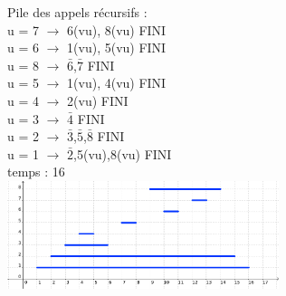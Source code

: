 Pile des appels récursifs : \\
u = 7 $\rightarrow$ 6(vu), 8(vu) FINI \\
u = 6 $\rightarrow$ 1(vu), 5(vu) FINI \\
u = 8 $\rightarrow$ $\bar{6}$,$\bar{7}$ FINI \\
u = 5 $\rightarrow$ 1(vu), 4(vu) FINI \\
u = 4 $\rightarrow$ 2(vu) FINI \\
u = 3 $\rightarrow$ $\bar{4}$ FINI \\
u = 2 $\rightarrow$ $\bar{3}$,$\bar{5}$,$\bar{8}$ FINI \\
u = 1 $\rightarrow$ $\bar{2}$,5(vu),8(vu) FINI \\
temps : 16 \\

\includegraphics[width=300px]{Images/fig12.pdf} \\
